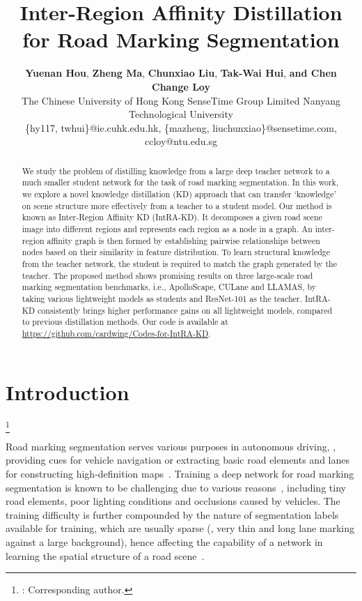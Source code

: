 \documentclass[10pt,twocolumn,letterpaper]{article}
\newcommand\blfootnote[1]{\begingroup
  \renewcommand\thefootnote{}\footnote{#1}\addtocounter{footnote}{-1}\endgroup
}
\begin{document}
\title{Inter-Region Affinity Distillation for Road Marking Segmentation}

\author{\textbf{Yuenan Hou}, \textbf{Zheng Ma}, \textbf{Chunxiao Liu}, \textbf{Tak-Wai Hui}, \textbf{and Chen Change Loy}\\
The Chinese University of Hong Kong SenseTime Group Limited Nanyang Technological University\\
\{hy117, twhui\}@ie.cuhk.edu.hk, \{mazheng, liuchunxiao\}@sensetime.com, ccloy@ntu.edu.sg
}

\maketitle
\def\algorithmname{IntRA-KD}

\begin{abstract}


We study the problem of distilling knowledge from a large deep teacher network to a much smaller student network for the task of road marking segmentation. 
In this work, we explore a novel knowledge distillation (KD) approach that can transfer `knowledge' on scene structure more effectively from a teacher to a student model. Our method is known as Inter-Region Affinity KD (IntRA-KD). It decomposes a given road scene image into different regions and represents each region as a node in a graph. An inter-region affinity graph is then formed by establishing pairwise relationships between nodes based on their similarity in feature distribution.
To learn structural knowledge from the teacher network, the student is required to match the graph generated by the teacher.
The proposed method shows promising results on three large-scale road marking segmentation benchmarks, i.e., ApolloScape, CULane and LLAMAS, by taking various lightweight models as students and ResNet-101 as the teacher.
IntRA-KD consistently brings higher performance gains on all lightweight models, compared to previous distillation methods. Our code is available at \url{https://github.com/cardwing/Codes-for-IntRA-KD}.%
 \end{abstract}


\section{Introduction}
\label{sec:introduction}


\blfootnote{: Corresponding author.}

Road marking segmentation serves various purposes in autonomous driving, \eg, providing cues for vehicle navigation or extracting basic road elements and lanes for constructing high-definition maps~\cite{Homayounfar_2019_ICCV}. 
Training a deep network for road marking segmentation is known to be challenging due to various reasons~\cite{hou2019learning}, including tiny road elements, poor lighting conditions and occlusions caused by vehicles.
The training difficulty is further compounded by the nature of segmentation labels available for training, which are usually sparse (\eg, very thin and long lane marking against a large background), hence affecting the capability of a network in learning the spatial structure of a road scene~\cite{hou2019learning,pan2017spatial}.
\end{document}
